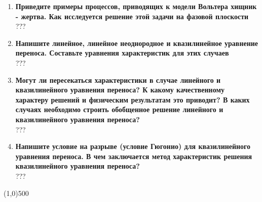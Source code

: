 \begin{enumerate}
      ???
\item \textbf{Приведите примеры процессов, приводящих к модели Вольтера хищник - жертва. Как исследуется решение этой задачи на фазовой плоскости}\\
      ???
\item \textbf{Напишите линейное, линейное неоднородное и квазилинейное уравнение переноса. Составьте уравнения характеристик для этих случаев}\\
      ???
\item \textbf{Могут ли пересекаться характеристики в случае линейного и квазилинейного уравнения переноса? К какому качественному характеру решений и физическим результатам это приводит? В каких случаях необходимо строить обобщенное решение линейного и квазилинейного уравнения переноса?}\\
      ???
\item \textbf{Напишите условие на разрыве (условие Гюгонио) для квазилинейного уравнения переноса. В чем заключается метод характеристик решения квазилинейного уравнения переноса?}\\
      ???
\end{enumerate}
\vfill\line(1,0){500}

